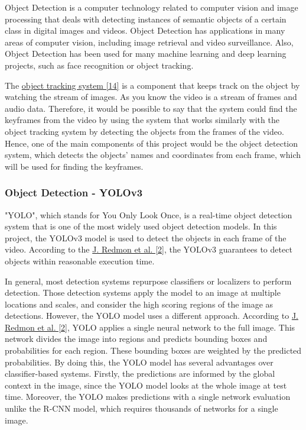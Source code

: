 \documentclass{article}
\begin{document}
Object Detection is a computer technology related to computer vision and image processing that deals with detecting instances of semantic objects of a certain class in digital images and videos. Object Detection has applications in many areas of computer vision, including image retrieval and video surveillance. Also, Object Detection has been used for many machine learning and deep learning projects, such as face recognition or object tracking.

The \hyperlink{ref14}{object tracking system [14]} is a component that keeps track on the object by watching the stream of images. As you know the video is a stream of frames and audio data. Therefore, it would be possible to say that the system could find the keyframes from the video by using the system that works similarly with the object tracking system by detecting the objects from the frames of the video. Hence, one of the main components of this project would be the object detection system, which detects the objects' names and coordinates from each frame, which will be used for finding the keyframes.

\subsubsection{Object Detection - YOLOv3}

"YOLO", which stands for You Only Look Once, is a real-time object detection system that is one of the most widely used object detection models. In this project, the YOLOv3 model is used to detect the objects in each frame of the video. According to the \hyperlink{ref2}{J. Redmon et al. [2]}, the YOLOv3 guarantees to detect objects within reasonable execution time.

In general, most detection systems repurpose classifiers or localizers to perform detection. Those detection systems apply the model to an image at multiple locations and scales, and consider the high scoring regions of the image as detections. However, the YOLO model uses a different approach. According to \hyperlink{ref2}{J. Redmon et al. [2]}, YOLO applies a single neural network to the full image. This network divides the image into regions and predicts bounding boxes and probabilities for each region. These bounding boxes are weighted by the predicted probabilities. By doing this, the YOLO model has several advantages over classifier-based systems. Firstly, the predictions are informed by the global context in the image, since the YOLO model looks at the whole image at test time. Moreover, the YOLO makes predictions with a single network evaluation unlike the R-CNN model, which requires thousands of networks for a single image.
\end{document}
